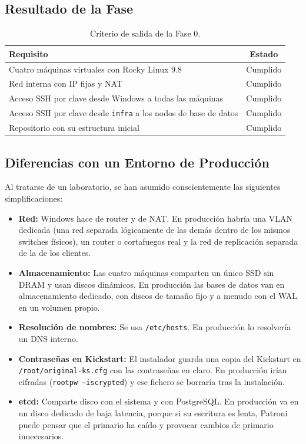 \documentclass[11pt, a4paper, titlepage]{article}
\newcommand{\cod}[1]{\texttt{#1}}
\begin{document}
\subsection{Resultado de la Fase}

\begin{table}[H]
\centering
\small
\begin{tabular}{lc}
\toprule
\textbf{Requisito} & \textbf{Estado} \\
\midrule
Cuatro máquinas virtuales con Rocky Linux 9.8 & Cumplido \\
Red interna con IP fijas y NAT & Cumplido \\
Acceso SSH por clave desde Windows a todas las máquinas & Cumplido \\
Acceso SSH por clave desde \cod{infra} a los nodos de base de datos & Cumplido \\
Repositorio con su estructura inicial & Cumplido \\
\bottomrule
\end{tabular}
\caption{Criterio de salida de la Fase 0.}
\label{tab:salida-fase0}
\end{table}

\subsection{Diferencias con un Entorno de Producción}

Al tratarse de un laboratorio, se han asumido conscientemente las siguientes simplificaciones:

\begin{itemize}
    \item \textbf{Red:} Windows hace de router y de NAT. En producción habría una VLAN dedicada (una red separada lógicamente de las demás dentro de los mismos switches físicos), un router o cortafuegos real y la red de replicación separada de la de los clientes.
    \item \textbf{Almacenamiento:} Las cuatro máquinas comparten un único SSD sin DRAM y usan discos dinámicos. En producción las bases de datos van en almacenamiento dedicado, con discos de tamaño fijo y a menudo con el WAL en un volumen propio.
    \item \textbf{Resolución de nombres:} Se usa \cod{/etc/hosts}. En producción lo resolvería un DNS interno.
    \item \textbf{Contraseñas en Kickstart:} El instalador guarda una copia del Kickstart en \cod{/root/original-ks.cfg} con las contraseñas en claro. En producción irían cifradas (\cod{rootpw --iscrypted}) y ese fichero se borraría tras la instalación.
    \item \textbf{etcd:} Comparte disco con el sistema y con PostgreSQL. En producción va en un disco dedicado de baja latencia, porque si su escritura es lenta, Patroni puede pensar que el primario ha caído y provocar cambios de primario innecesarios.
\end{itemize}
\end{document}
